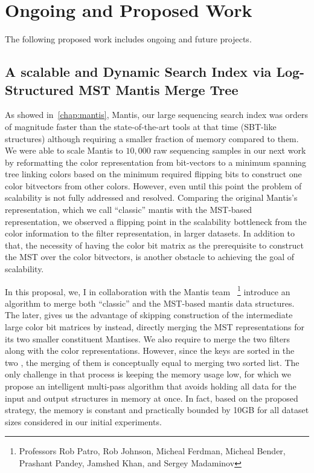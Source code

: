 
\chapter{Ongoing and Proposed Work}

The following proposed work includes ongoing and future projects.

\section{A scalable and Dynamic Search Index via Log-Structured MST Mantis Merge Tree}

As showed in~\ref{chap:mantis}, Mantis, our large sequencing search index
was orders of magnitude faster than the state-of-the-art tools at that time (SBT-like structures)
although requiring a smaller fraction of memory compared to them.
We were able to scale Mantis to $10,000$ raw sequencing samples in our next work
by reformatting the color representation from bit-vectors to a minimum spanning tree
linking colors based on the minimum required flipping bits
to construct one color bitvectors from other colors.
However, even until this point the problem of scalability is not fully addressed
and resolved.
Comparing the original Mantis's representation, which we call ``classic'' mantis
with the MST-based representation, we observed a flipping point in the scalability bottleneck
from the color information to the \kmer filter representation, \cqf
in larger datasets.
In addition to that, the necessity of having the color bit matrix as the prerequisite
to construct the MST over the color bitvectors, is another obstacle
to achieving the goal of scalability.

In this proposal, we, I in collaboration with the Mantis team
~\footnote{Professors Rob Patro, Rob Johnson, Micheal Ferdman, Micheal Bender, Prashant Pandey, Jamshed Khan,
and Sergey Madaminov} introduce an algorithm to merge both “classic”
and the MST-based mantis data structures. The later, gives us the advantage of skipping
construction of the intermediate large color bit matrices by instead, directly merging
the MST representations for its two smaller constituent Mantises.
We also require to merge the two filters along with the color representations.
However, since the keys are sorted in the two \cqfs, the merging of them
is conceptually equal to merging two sorted list.
The only challenge in that process is keeping the memory usage low,
for which we propose an intelligent multi-pass algorithm that avoids holding
all data for the input and output structures in memory at once.
In fact, based on the proposed strategy, the memory is constant and
practically bounded by 10GB for all dataset sizes considered in our initial experiments.

